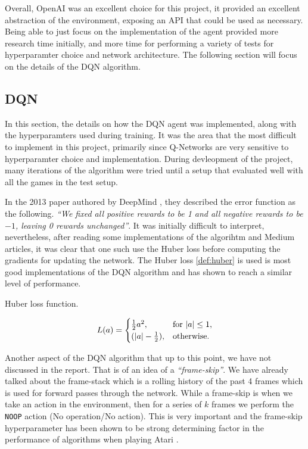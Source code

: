 Overall, OpenAI was an excellent choice for this project, it provided an excellent abstraction of the environment, exposing an API that could be used as necessary. Being able to just focus on the implementation of the agent provided more research time initially, and more time for performing a variety of tests for hyperparamter choice and network architecture. The following section will focus on the details of the DQN algorithm.

\subsection{DQN}
In this section, the details on how the DQN agent was implemented, along with the hyperparamters used during training. It was the area that the most difficult to implement in this project, primarily since Q-Networks are very sensitive to hyperparamter choice and implementation. During devleopment of the project, many iterations of the algorithm were tried until a setup that evaluated well with all the games in the test setup.

In the 2013 paper authored by DeepMind \cite{dqn}, they described the error function as the following. \textit{``We fixed all positive rewards to be 1 and all negative rewards to be $-1$, leaving 0 rewards unchanged''}. It was initially difficult to interpret, nevertheless, after reading some implementations of the algorihtm and Medium articles, it was clear that one such use the Huber loss before computing the gradients for updating the network. The Huber loss \ref{def:huber} is used is most good implementations of the DQN algorithm and has shown to reach a similar level of performance.

\begin{defn}
  Huber loss function.

  \begin{equation}
    L(a)=\begin{cases}
      \frac{1}{2}a^2,          & \text{for $\abs{a} \leq 1$}, \\
      (\abs{a} - \frac{1}{2}), & \text{otherwise}.
    \end{cases}
  \end{equation}
  \label{def:huber}
\end{defn}

Another aspect of the DQN algorithm that up to this point, we have not discussed in the report. That is of an idea of a \textit{``frame-skip''}. We have already talked about the frame-stack which is a rolling history of the past 4 frames which is used for forward passes through the network. While a frame-skip is when we take an action in the environment, then for a series of $k$ frames we perform the \texttt{NOOP} action (No operation/No action). This is very important and the frame-skip hyperparameter has been shown to be strong determining factor in the performance of algorithms when playing Atari \cite{braylan2015frame}.

